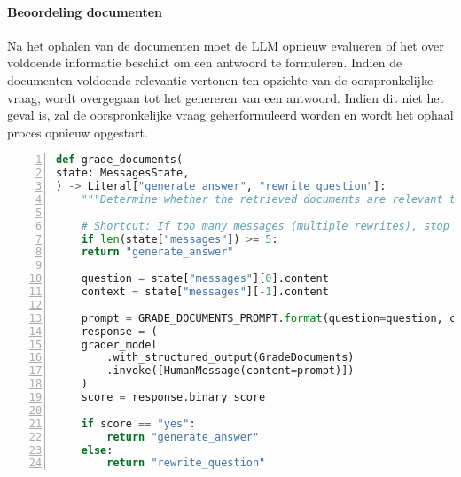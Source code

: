 \paragraph{Beoordeling documenten}

Na het ophalen van de documenten moet de LLM opnieuw evalueren of het over voldoende informatie beschikt om een antwoord te formuleren. Indien de documenten voldoende relevantie vertonen ten opzichte van de oorspronkelijke vraag, wordt overgegaan tot het genereren van een antwoord. Indien dit niet het geval is, zal de oorspronkelijke vraag geherformuleerd worden en wordt het ophaal proces opnieuw opgestart.

\begin{lstlisting}[basicstyle=\small, frame=single, breaklines=true, postbreak=\mbox{\textcolor{red}{$\hookrightarrow$}\space}, escapeinside ={\%,}, escapechar={!}, numbers=left, language=Python, caption=Beoordeling van documenten]
def grade_documents(
state: MessagesState,
) -> Literal["generate_answer", "rewrite_question"]:
    """Determine whether the retrieved documents are relevant to the question."""
    
    # Shortcut: If too many messages (multiple rewrites), stop rewriting
    if len(state["messages"]) >= 5:
    return "generate_answer"
    
    question = state["messages"][0].content
    context = state["messages"][-1].content
    
    prompt = GRADE_DOCUMENTS_PROMPT.format(question=question, context=context)
    response = (
    grader_model
        .with_structured_output(GradeDocuments)
        .invoke([HumanMessage(content=prompt)])
    )
    score = response.binary_score
    
    if score == "yes":
        return "generate_answer"
    else:
        return "rewrite_question"
\end{lstlisting}

